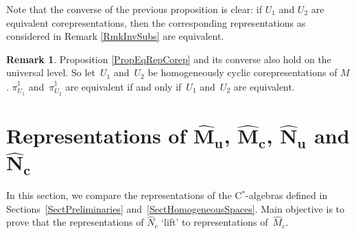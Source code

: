\documentclass[pdftex]{sigma}
\numberwithin{equation}{section}
\theoremstyle{definition}
\newtheorem{rmk}[thm]{Remark}
\begin{document}
Note that the converse of the previous proposition is clear: if $U_1$ and $U_2$ are equivalent corepresentations, then the corresponding representations as considered in Remark \ref{RmkInvSubs} are equivalent.

\begin{rmk}\label{RmkAlsoUniv}
Proposition \ref{PropEqRepCorep} and its converse also hold on the universal level. So let~$U_1$ and~$U_2$ be homogeneously cyclic corepresentations of $M$. $\pi_{U_1}^\natural$ and~$\pi_{U_2}^\natural$
 are equivalent if and only if~$U_1$ and~$U_2$ are equivalent.
\end{rmk}



\section[Representations of $\hat{M}_u$, $\hat{M}_c$, $\hat{N}_u$ and $\hat{N}_c$]{Representations of $\boldsymbol{\hat{M}_u}$, $\boldsymbol{\hat{M}_c}$, $\boldsymbol{\hat{N}_u}$ and $\boldsymbol{\hat{N}_c}$}\label{SectCorrespondence}

In this section, we compare the representations of the C$^\ast$-algebras def\/ined in Sections~\ref{SectPreliminaries} and~\ref{SectHomogeneousSpaces}. Main objective is to prove that the representations of $\hat{N}_c$ `lift' to representations of~$\hat{M}_c$.
\end{document}
